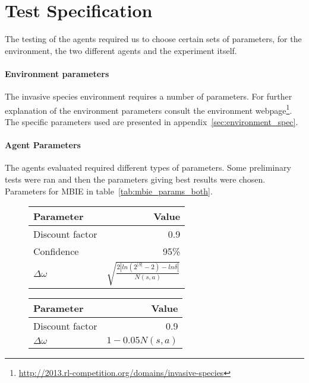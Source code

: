 \section{Test Specification }
\label{sec:test_spec}

The testing of the agents required us to choose certain sets of parameters, for the environment, the two different agents and the experiment itself. 

\paragraph{Environment parameters}
The invasive species environment requires a number of parameters. For further explanation of the environment parameters consult the environment webpage\footnote{\url{http://2013.rl-competition.org/domains/invasive-species}}. The specific parameters used are presented in appendix~\ref{sec:environment_spec}.


\paragraph{Agent Parameters}

The agents evaluated required different types of parameters. Some preliminary tests were ran and then the parameters giving best results were chosen. Parameters for MBIE in table~\ref{tab:mbie_params_both}.

\begin{table}[H]
\centering
{}
\label{tab:mbie_params_both}

\begin{subfigure}[b]{0.47\textwidth}
    \centering
    \label{tab:mbie_params} 
    \begin{tabular}{lr}
     \toprule
     Parameter & Value \\
     \midrule
     Discount factor & 0.9 \\
     Confidence & 95\% \\
     $\Delta \omega$ & $\sqrt{\frac{2|ln(2^{|S|}-2) - ln  \delta |}{N(s,a)}}$ \\
     
     \bottomrule
    \end{tabular}
\end{subfigure}
\quad
\begin{subfigure}[b]{0.47\textwidth}
    \centering
    \label{tab:mbie_realistic_params}
    \begin{tabular}{lr}
     \toprule
     Parameter & Value \\
     \midrule
     Discount factor & 0.9 \\
     $\Delta \omega$ & $1 - 0.05 N(s,a)$ \\
     \bottomrule
    \end{tabular}
\end{subfigure}
\end{table}

